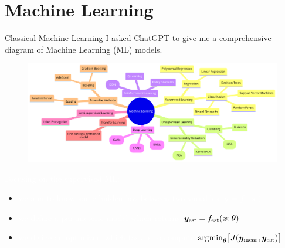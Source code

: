 \documentclass[8pt, xcolor={svgnames}, hyperref={linkcolor=black}]{beamer}
\begin{document}
\section{Machine Learning}

\begin{frame}{Classical Machine Learning}
I asked ChatGPT to give me a comprehensive diagram of Machine Learning (ML) models.
\begin{figure}
   \includegraphics[width=1\linewidth, height=0.5\textheight]{figures/ml.png}
\end{figure}  
\textcolor{white}{Focusing on the supervised ML:}
\begin{itemize}[noitemsep]
\item[] \textcolor{white}{we aim to know some hidden law between two variables: $\bm{y}=f(\bm{x})$}
\item[] \textcolor{white}{we define a parameteric model which returns $\bm{y}_{\rm est}=f_{\rm est}(\bm{x}; \bm{\theta})$}
\item[] \textcolor{white}{we define an optimizer, which task is to compute} 
   \textcolor{white}{$\text{argmin}_{\bm{\theta}}\bigl[J(\bm{y}_{\rm meas}, \bm{y}_{\rm est})\bigr]$}
\end{itemize}
\end{frame}
\end{document}
